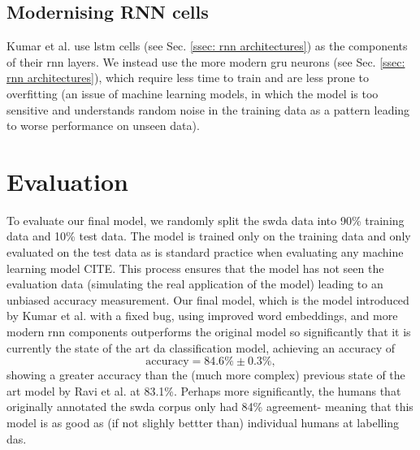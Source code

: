     \subsection{Modernising RNN cells}
    Kumar et al.\cite{kumar2017dialogue} use \gls{lstm} cells (see Sec. \ref{ssec: rnn architectures}) as the components of their \gls{rnn} layers. We instead use the more modern \gls{gru}\cite{chung2014empirical} neurons (see Sec. \ref{ssec: rnn architectures}), which require less time to train and are less prone to overfitting (an issue of machine learning models, in which the \gls{model} is too sensitive and understands random noise in the training data as a pattern leading to worse performance on unseen data)\cite{chung2014empirical}.
    
    \section{Evaluation \label{ssec: method my da model evaluation}}
    
    To evaluate our final \gls{model}, we randomly split the \gls{swda} data into 90\% training data and 10\% test data. The \gls{model} is trained only on the training data and only evaluated on the test data as is standard practice when evaluating any machine learning \gls{model} CITE. This process ensures that the \gls{model} has not seen the evaluation data (simulating the real application of the \gls{model}) leading to an unbiased accuracy measurement.
    Our final \gls{model}, which is the \gls{model} introduced by Kumar et al.\cite{kumar2017dialogue} with a fixed bug, using improved word \glspl{embedding}, and more modern \gls{rnn} components outperforms the original \gls{model} so significantly that it is currently the state of the art \gls{da} classification \gls{model}, achieving an accuracy of 
    \begin{equation}
        \text{accuracy} = 84.6 \% \pm 0.3\%,
        \label{eq: my da model accuracy}
    \end{equation}
    showing a greater accuracy than the (much more complex) previous state of the art \gls{model} by Ravi et al. at 83.1\%\cite{ravi2018self}. Perhaps more significantly, the humans that originally annotated the \gls{swda} corpus only had 84\% agreement\cite{swda}- meaning that this \gls{model} is as good as (if not slighly bettter than) individual humans at labelling \glspl{da}. \newline